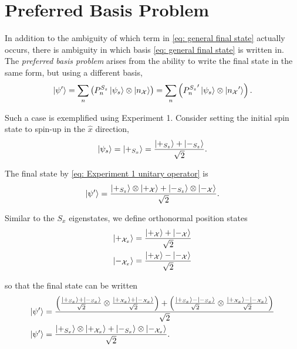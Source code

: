 \section{Preferred Basis Problem}
In addition to the ambiguity of which term in \autoref{eq: general final state} actually occurs, there is ambiguity in which basis \autoref{eq: general final state} is written in. The \textit{preferred basis problem} arises from the ability to write the final state in the same form, but using a different basis,
\begin{align}  \label{eq: preferred basis state general}
  \ket{\psi'} = \sum_{n}\left(P^{S_z}_n\ket{\psi_s} \otimes \ket{n_\mathcal{X}}\right) = \sum_{n}\left({P^{S_z}_{n}}' \ket{\psi_s} \otimes \ket{{n_\mathcal{X}}'}\right).
\end{align}

Such a case is exemplified using Experiment 1. Consider setting the initial spin state to spin-up in the $\hat{x}$ direction,
\begin{align}
  \ket{\psi_s} = \ket{+_{S_x}} = \frac{\ket{+_{S_z}} + \ket{-_{S_z}}}{\sqrt{2}}.
\end{align}

The final state by \autoref{eq: Experiment 1 unitary operator} is
\begin{align} \label{eq:preferred basis state z}
  \ket{\psi'} = \frac{\ket{+_{S_z}}\otimes\ket{+_{\mathcal{X}}} + \ket{-_{S_z}}\otimes\ket{-_{\mathcal{X}}}}{\sqrt{2}}.
\end{align}

Similar to the $S_x$ eigenstates, we define orthonormal position states
\begin{align}
  \ket{+_{{\mathcal{X}}_x}} = \frac{\ket{+_{\mathcal{X}}} + \ket{-_{\mathcal{X}}}}{\sqrt{2}} \\ \nonumber
  \ket{-_{{\mathcal{X}}_x}} = \frac{\ket{+_{\mathcal{X}}} - \ket{-_{\mathcal{X}}}}{\sqrt{2}}
\end{align}

so that the final state can be written
\begin{align} \label{eq:preferred basis state x}
  \ket{\psi'} &= \frac{ \left(\frac{\ket{+_{S_x}} + \ket{-_{S_x}}}{\sqrt{2}} \otimes \frac{\ket{+_{{\mathcal{X}}_x}} + \ket{-_{{\mathcal{X}}_x}}}{\sqrt{2}} \right) +  \left(\frac{\ket{+_{S_x}} - \ket{-_{S_x}}}{\sqrt{2}} \otimes \frac{\ket{+_{{\mathcal{X}}_x}} - \ket{-_{{\mathcal{X}}_x}}}{\sqrt{2}} \right) }{\sqrt{2}} \\ \nonumber
  \ket{\psi'} &= \frac{\ket{+_{S_x}} \otimes \ket{+_{{\mathcal{X}}_x}} + \ket{-_{S_x}} \otimes \ket{-_{{\mathcal{X}}_x}}}{\sqrt{2}}.
\end{align}

